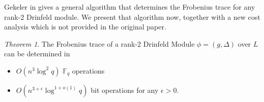 \documentclass{acmart}
\theoremstyle{remark}
\numberwithin{equation}{section}
\newtheorem{theorem}{Theorem}
\begin{document}



Gekeler in \cite{frobdist} gives a general algorithm that determines the Frobenius trace  for any rank-2 Drinfeld module. We present that algorithm now, together with a new cost analysis which is not provided in the original paper.



\begin{theorem}

The Frobenius trace of a rank-2 Drinfeld Module $\phi = (g, \Delta)$ over $L$ can be determined in

\begin{itemize}
\item $O(n^3 \log^2 q)$ $\mathbb{F}_q$ operations
\item $O(n^{3+\epsilon} \log^{1+o(1)} q)$ bit operations for any $\epsilon > 0$.
\end{itemize}

\end{theorem}
\end{document}
